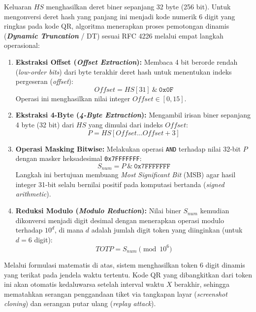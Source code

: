 Keluaran $HS$ menghasilkan deret biner sepanjang 32 byte (256 bit). Untuk mengonversi deret hash yang panjang ini menjadi kode numerik 6 digit yang ringkas pada kode QR, algoritma menerapkan proses pemotongan dinamis (\textbf{\textit{Dynamic Truncation}} / DT) sesuai RFC 4226 melalui empat langkah operasional:
\begin{enumerate}
    \item \textbf{Ekstraksi Offset (\textit{Offset Extraction}): } 
    Membaca 4 bit berorde rendah (\textit{low-order bits}) dari byte terakhir deret hash untuk menentukan indeks pergeseran (\textit{offset}):
    \begin{equation}
        Offset = HS[31] \ \& \ \texttt{0x0F}
    \end{equation}
    Operasi ini menghasilkan nilai integer $Offset \in [0, 15]$.
    
    \item \textbf{Ekstraksi 4-Byte (\textit{4-Byte Extraction}): }
    Mengambil irisan biner sepanjang 4 byte (32 bit) dari $HS$ yang dimulai dari indeks $Offset$:
    \begin{equation}
        P = HS[Offset \dots Offset+3]
    \end{equation}
    
    \item \textbf{Operasi Masking Bitwise: }
    Melakukan operasi \texttt{AND} terhadap nilai 32-bit $P$ dengan masker heksadesimal \texttt{0x7FFFFFFF}:
    \begin{equation}
        S_{num} = P \ \& \ \texttt{0x7FFFFFFF}
    \end{equation}
    Langkah ini bertujuan membuang \textit{Most Significant Bit} (MSB) agar hasil integer 31-bit selalu bernilai positif pada komputasi bertanda (\textit{signed arithmetic}).
    
    \item \textbf{Reduksi Modulo (\textit{Modulo Reduction}): }
    Nilai biner $S_{num}$ kemudian dikonversi menjadi digit desimal dengan menerapkan operasi modulo terhadap $10^d$, di mana $d$ adalah jumlah digit token yang diinginkan (untuk $d = 6$ digit):
    \begin{equation}
        TOTP = S_{num} \pmod{10^6}
    \end{equation}
\end{enumerate}

Melalui formulasi matematis di atas, sistem menghasilkan token 6 digit dinamis yang terikat pada jendela waktu tertentu. Kode QR yang dibangkitkan dari token ini akan otomatis kedaluwarsa setelah interval waktu $X$ berakhir, sehingga mematahkan serangan penggandaan tiket via tangkapan layar (\textit{screenshot cloning}) dan serangan putar ulang (\textit{replay attack}).

